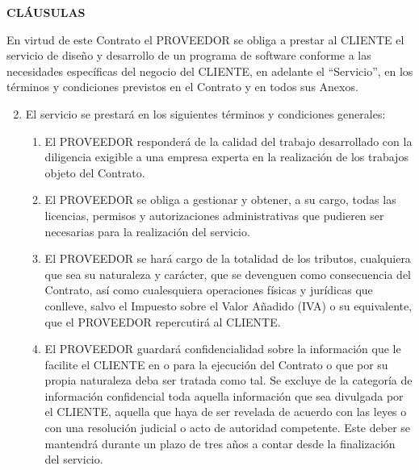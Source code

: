 \begin{center}
  \textbf{CLÁUSULAS}
\end{center}

\renewcommand{\labelenumi}{%
 \textbf{\theenumi}.-
}

\renewcommand{\theenumii}{\arabic{enumii}}
\renewcommand{\labelenumii}{%
 \textbf{\theenumi}.\theenumii.-
}

\renewcommand{\theenumiii}{\arabic{enumiii}}
\renewcommand{\labelenumiii}{%
 \textbf{\theenumi}.\theenumii.\theenumiii.-
}

\begin{description}[style=nextline]
\item[PRIMERA.- OBJETO]
		En virtud de este Contrato el PROVEEDOR se obliga a prestar al CLIENTE el servicio de diseño y desarrollo de un programa de software conforme a las necesidades específicas del negocio del CLIENTE, en adelante el “Servicio”, en los términos y condiciones previstos en el Contrato y en todos sus Anexos.
\item[SEGUNDA.- TÉRMINOS Y CONDICIONES GENERALES Y ESPECÍFICOS DE PRESTACIÓN DE EL SERVICIO]
\newline
\begin{enumerate}
  \setcounter{enumi}{1}
  \item El servicio se prestará en los siguientes términos y condiciones generales:
  \begin{enumerate}
    \item El PROVEEDOR responderá de la calidad del trabajo desarrollado con la diligencia exigible a una empresa experta en la realización de los trabajos objeto del Contrato.
    \item El PROVEEDOR se obliga a gestionar y obtener, a su cargo, todas las licencias, permisos y autorizaciones administrativas que pudieren ser necesarias para la realización del servicio.
    \item El PROVEEDOR se hará cargo de la totalidad de los tributos, cualquiera que sea su naturaleza y carácter, que se devenguen como consecuencia del Contrato, así como cualesquiera operaciones físicas y jurídicas que conlleve, salvo el Impuesto sobre el Valor Añadido (IVA) o su equivalente, que el PROVEEDOR repercutirá al CLIENTE.
    \item El PROVEEDOR guardará confidencialidad sobre la información que le facilite el CLIENTE en o para la ejecución del Contrato o que por su propia naturaleza deba ser tratada como tal. Se excluye de la categoría de información confidencial toda aquella información que sea divulgada por el CLIENTE, aquella que haya de ser revelada de acuerdo con las leyes o con una resolución judicial o acto de autoridad competente. Este deber se mantendrá durante un plazo de tres años a contar desde la finalización del servicio.

\end{enumerate}
\end{enumerate}
\end{description}
